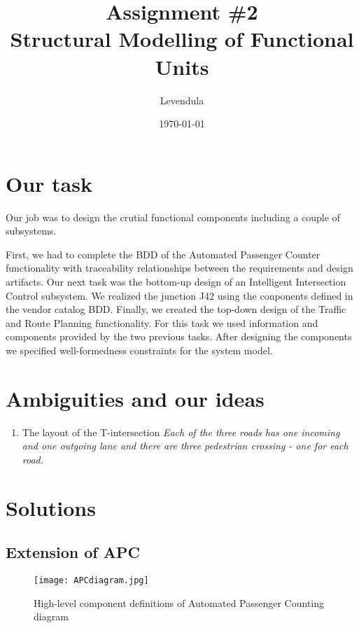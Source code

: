 \documentclass[a4paper]{article}
\title{Assignment \#2 \\ Structural Modelling of Functional Units}
\author{Levendula}
\date{\today}
\begin{document}


\tableofcontents
\listoffigures
\clearpage

\section{Our task}

Our job was to design the crutial functional components including a couple of
subsystems.

First, we had to complete the BDD of the {Automated Passenger Counter}
functionality with traceability relationships between the requirements and
design artifacts. Our next task was the bottom-up design of an {Intelligent
Intersection Control} subsystem. We realized the junction J42 using the
conponents defined in the vendor catalog BDD. Finally, we created the top-down
design of the {Traffic and Route Planning} functionality. For this task we used
information and components provided by the two previous tasks. After designing
the components we specified well-formedness constraints for the system model.
\section{Ambiguities and our ideas}

\begin{enumerate}
	\item The layout of the T-intersection
		\textit{Each of the three roads has one incoming and one
			outgoing lane and there are three pedestrian crossing -
			one for each road.}
\end{enumerate}

\section{Solutions}

\subsection{Extension of APC}

\begin{sidewaysfigure}
	\centering
	\texttt{[image: APCdiagram.jpg]}
	\caption{High-level component definitions of Automated Passenger Counting diagram}%
	\label{fig:APCdiagram}
\end{sidewaysfigure}
\end{document}
